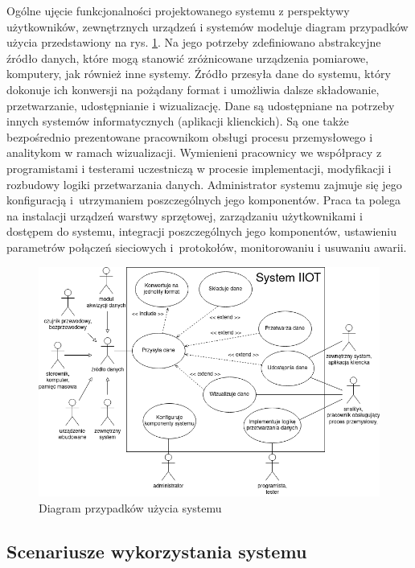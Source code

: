 \documentclass[a4paper, 12pt, twoside]{article}
\begin{document}
Ogólne ujęcie funkcjonalności projektowanego systemu z perspektywy użytkowników,
zewnętrznych urządzeń i systemów modeluje diagram przypadków użycia przedstawiony
na rys. \ref{fig:use-case}. Na jego potrzeby zdefiniowano abstrakcyjne
źródło danych, które mogą stanowić zróżnicowane urządzenia pomiarowe, komputery,
jak również inne systemy. Źródło przesyła
dane do systemu, który dokonuje ich konwersji na pożądany format i umożliwia
dalsze składowanie, przetwarzanie, udostępnianie i wizualizację. Dane są
udostępniane na potrzeby innych systemów informatycznych (aplikacji klienckich).
Są one także bezpośrednio prezentowane pracownikom obsługi procesu przemysłowego
i analitykom w ramach wizualizacji. Wymienieni pracownicy we
współpracy z programistami i testerami uczestniczą
w procesie implementacji, modyfikacji i rozbudowy logiki przetwarzania danych.
Administrator systemu zajmuje się jego konfiguracją i~utrzymaniem
poszczególnych jego komponentów. Praca ta polega na
instalacji urządzeń warstwy sprzętowej, zarządzaniu
użytkownikami i dostępem do systemu, integracji poszczególnych jego komponentów,
ustawieniu parametrów połączeń sieciowych i~protokołów, monitorowaniu
i usuwaniu awarii.

\begin{figure}
      \centering
      \includegraphics[width=\textwidth]{use-case.png}
      \caption{Diagram przypadków użycia systemu}
      \label{fig:use-case}
\end{figure}

\subsection{Scenariusze wykorzystania systemu}\label{scenariusze}
\end{document}
